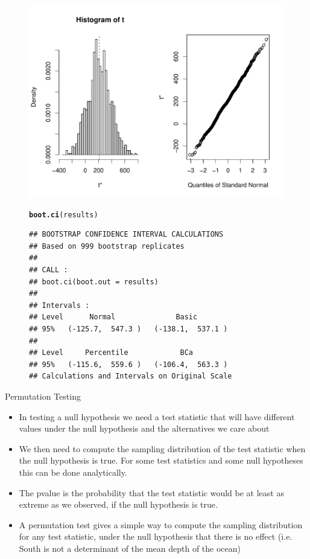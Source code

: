 \documentclass[10pt]{beamer}\usepackage[]{graphicx}\usepackage[]{color}
\makeatletter
\def\maxwidth{ %
  \ifdim\Gin@nat@width>\linewidth
    \linewidth
  \else
    \Gin@nat@width
  \fi
}
\newcommand{\hlstd}[1]{\textcolor[rgb]{0.345,0.345,0.345}{#1}}%
\newcommand{\hlkwd}[1]{\textcolor[rgb]{0.737,0.353,0.396}{\textbf{#1}}}%
\newenvironment{kframe}{%
 \def\at@end@of@kframe{}%
 \ifinner\ifhmode%
  \def\at@end@of@kframe{\end{minipage}}%
  \begin{minipage}{\columnwidth}%
 \fi\fi%
 \def\FrameCommand##1{\hskip\@totalleftmargin \hskip-\fboxsep
 \colorbox{shadecolor}{##1}\hskip-\fboxsep
     \hskip-\linewidth \hskip-\@totalleftmargin \hskip\columnwidth}%
 \MakeFramed {\advance\hsize-\width
   \@totalleftmargin\z@ \linewidth\hsize
   \@setminipage}}%
 {\par\unskip\endMakeFramed%
 \at@end@of@kframe}
\newenvironment{knitrout}{}{} %
\makeatother
\begin{document}
\begin{frame}
\begin{figure}
\begin{minipage}[h]{0.50\linewidth}
\begin{knitrout}
{\centering \includegraphics[width=\maxwidth]{figure/unnamed-chunk-9-1} 

}


\begin{kframe}\begin{alltt}
\hlkwd{boot.ci}\hlstd{(results)}
\end{alltt}
\begin{verbatim}
## BOOTSTRAP CONFIDENCE INTERVAL CALCULATIONS
## Based on 999 bootstrap replicates
## 
## CALL : 
## boot.ci(boot.out = results)
## 
## Intervals : 
## Level      Normal              Basic         
## 95%   (-125.7,  547.3 )   (-138.1,  537.1 )  
## 
## Level     Percentile            BCa          
## 95%   (-115.6,  559.6 )   (-106.4,  563.3 )  
## Calculations and Intervals on Original Scale
\end{verbatim}
\end{kframe}
\end{knitrout}
	\end{minipage}
\end{figure}
\end{frame}


\begin{frame}{Permutation Testing}
\begin{itemize}
	\item In testing a null hypothesis we need a test statistic that will have different values under the null hypothesis and the alternatives we	care about 
	\item We then need to compute the sampling distribution of the test	statistic when the null hypothesis is true. For some test statistics	and some null hypotheses this can be done analytically. 
	\item The pvalue is the probability that the test statistic would be at	least as extreme as we observed, if the null hypothesis is true.
	\item A permutation test gives a simple way to compute the sampling	distribution for any test statistic, under the null hypothesis that there is no effect (i.e. South is not a determinant of the mean depth of the ocean)
\end{itemize}
\end{frame}
\end{document}
